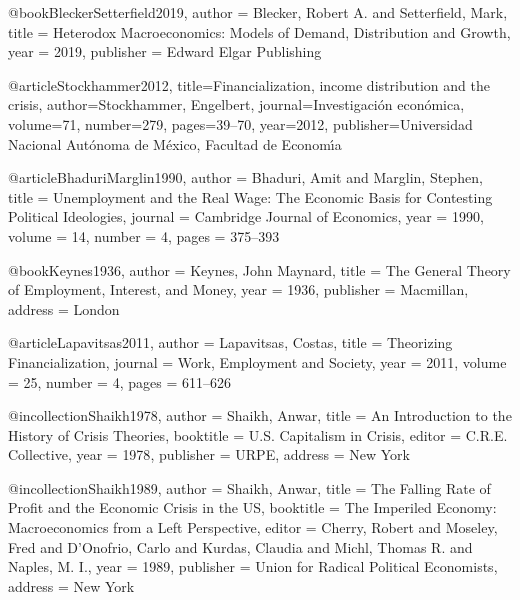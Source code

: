 @book{BleckerSetterfield2019,
	author    = {Blecker, Robert A. and Setterfield, Mark},
	title     = {Heterodox Macroeconomics: Models of Demand, Distribution and Growth},
	year      = {2019},
	publisher = {Edward Elgar Publishing}
}

@article{Stockhammer2012,
	title={Financialization, income distribution and the crisis},
	author={Stockhammer, Engelbert},
	journal={Investigaci{\'o}n econ{\'o}mica},
	volume={71},
	number={279},
	pages={39--70},
	year={2012},
	publisher={Universidad Nacional Aut{\'o}noma de M{\'e}xico, Facultad de Econom{\'\i}a}
}

@article{BhaduriMarglin1990,
	author  = {Bhaduri, Amit and Marglin, Stephen},
	title   = {Unemployment and the Real Wage: The Economic Basis for Contesting Political Ideologies},
	journal = {Cambridge Journal of Economics},
	year    = {1990},
	volume  = {14},
	number  = {4},
	pages   = {375--393}
}

@book{Keynes1936,
	author    = {Keynes, John Maynard},
	title     = {The General Theory of Employment, Interest, and Money},
	year      = {1936},
	publisher = {Macmillan},
	address   = {London}
}



@article{Lapavitsas2011,
	author  = {Lapavitsas, Costas},
	title   = {Theorizing Financialization},
	journal = {Work, Employment and Society},
	year    = {2011},
	volume  = {25},
	number  = {4},
	pages   = {611--626}
}



@incollection{Shaikh1978,
	author    = {Shaikh, Anwar},
	title     = {An Introduction to the History of Crisis Theories},
	booktitle = {U.S. Capitalism in Crisis},
	editor    = {C.R.E. Collective},
	year      = {1978},
	publisher = {URPE},
	address   = {New York}
}

@incollection{Shaikh1989,
	author    = {Shaikh, Anwar},
	title     = {The Falling Rate of Profit and the Economic Crisis in the {US}},
	booktitle = {The Imperiled Economy: Macroeconomics from a Left Perspective},
	editor    = {Cherry, Robert and Moseley, Fred and D'Onofrio, Carlo and Kurdas, Claudia and Michl, Thomas R. and Naples, M. I.},
	year      = {1989},
	publisher = {Union for Radical Political Economists},
	address   = {New York}
}



